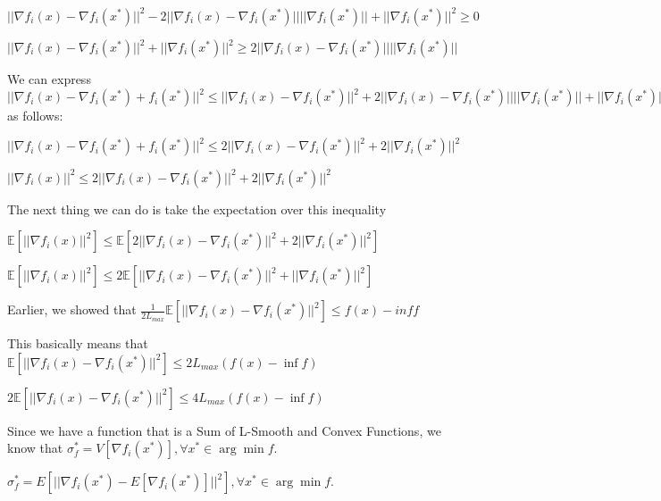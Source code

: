 $||\nabla f_i(x) - \nabla f_i(x^*)||^2 - 2 ||\nabla f_i(x) - \nabla f_i(x^*)|| ||\nabla f_i(x^*)|| + ||\nabla f_i(x^*)||^2 \geq 0$ \newline 

$||\nabla f_i(x) - \nabla f_i(x^*)||^2  + ||\nabla f_i(x^*)||^2 \geq 2 ||\nabla f_i(x) - \nabla f_i(x^*)|| ||\nabla f_i(x^*)||$ \newline 

We can express $||\nabla f_i(x) - \nabla f_i(x^*) + f_i(x^*)||^2 \leq ||\nabla f_i(x) - \nabla f_i(x^*)||^2 + 2 ||\nabla f_i(x) - \nabla f_i(x^*)|| ||\nabla f_i(x^*)|| + ||\nabla f_i(x^*)||^2$  as follows: \newline 

$||\nabla f_i(x) - \nabla f_i(x^*) + f_i(x^*)||^2 \leq 2||\nabla f_i(x) - \nabla f_i(x^*)||^2 + 2||\nabla f_i(x^*)||^2$ \newline 

$||\nabla f_i(x)||^2 \leq 2||\nabla f_i(x) - \nabla f_i(x^*)||^2 + 2||\nabla f_i(x^*)||^2$ \newline 

The next thing we can do is take the expectation over this inequality \newline

\noindent $\mathbb{E}[||\nabla f_i(x)||^2] \leq \mathbb{E} [2||\nabla f_i(x) - \nabla f_i(x^*)||^2 + 2||\nabla f_i(x^*)||^2]$ \newline 

$\mathbb{E}[||\nabla f_i(x)||^2] \leq 2\mathbb{E} [||\nabla f_i(x) - \nabla f_i(x^*)||^2 + ||\nabla f_i(x^*)||^2]$ \newline 

Earlier, we showed that $\frac{1}{2L_{max}} \mathbb{E}[||\nabla f_i(x) - \nabla f_i(x^*)||^2] \leq f(x) - inf f$ \newline 

This basically means that $\mathbb{E}[||\nabla f_i(x) - \nabla f_i(x^*)||^2] \leq 2L_{max} (f(x) - \inf f)$ \newline 

$2\mathbb{E}[||\nabla f_i(x) - \nabla f_i(x^*)||^2] \leq 4L_{max} (f(x) - \inf f)$

Since we have a function that is a Sum of L-Smooth and Convex Functions, we know that \newline 
\noindent $\sigma_f^* = V[\nabla f_i(x^*)], \forall x^* \in \arg \min f.$ \newline 

\noindent $\sigma_f^* = E[||\nabla f_i(x^*) - E[\nabla f_i(x^*)]||^2], \forall x^* \in \arg \min f.$ \newline 

